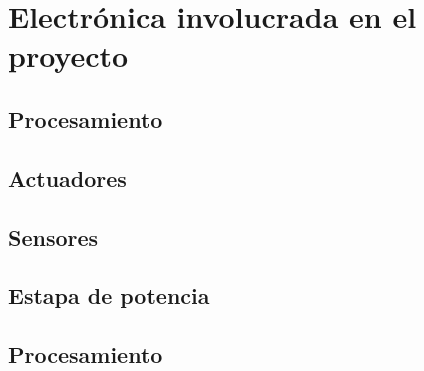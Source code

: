 \chapter{Electrónica involucrada en el proyecto}

\section{Procesamiento}

\section{Actuadores}

\section{Sensores}

\section{Estapa de potencia}

\section{Procesamiento}
